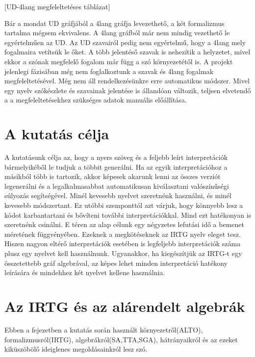 [UD-4lang megfeleltetéses táblázat]

Bár a mondat UD gráfjából a 4lang gráfja levezethető, a két formalizmus tartalma mégsem ekvivalens. A 4lang gráfból már nem mindig vezethető le egyértelműen az UD. Az UD szavairól pedig nem egyértelmű, hogy a 4lang mely fogalmaira vetítsük le őket. A több jelentéső szavak is nehezítik a helyzetet, mivel ekkor a szónak megfelelő fogalom már függ a szó környezetétől is. A projekt jelenlegi fázisában még nem foglalkoztunk a szavak és 4lang fogalmak megfeleltetésével. Még nem áll rendelkezésünkre erre automatikus módszer. Mivel egy nyelv szókészlete és szavainak jelentése is állandóan változik, teljsen elvetendő a a megfeleltetésekhez szükséges adatok manuális előállítása.



\section{A kutatás célja}


A kutatásunk célja az, hogy a nyers szöveg és a feljebb leírt interpretációk bármelyikéből le tudjuk a többit generálni. Ha az egyik interpretációhoz a másikból több is tartozik, akkor képesek akarunk lenni az összes verziót legenerálni és a legalkalmasabbat automatikusan kiválasztani valószínűségi súlyozás segítségével. Minél kevesebb nyelvet szeretnénk használni, és minél kevesebb módszertant. Ez utóbbi szemponttól azt várjuk, hogy könnyebb lesz a kódot karbantartani és bővíteni további interpretációkkal. Mind ezt hatékonyan is szeretnénk csinálni. E téren az alap célunk egy négyzetes lefutási idő a bemenet méretének függvényében. Ezeknek a megkötéseknek az IRTG nyelv eleget tesz. Hiszen nagyon eltérő interpretációk esetében is legfeljebb interpretációk száma plusz egy nyelvet kell használnunk. Ugyanakkor, ha kiegészítjük az IRTG-t egy összetettebb gráf algebrával, az képes lehet minden interpretáció hatékony leírására és mindehhez két nyelvet kellene használnia.

\section{Az IRTG és az alárendelt algebrák}
Ebben a fejezetben a kutatás során használt környezetről(ALTO), formalizmusról(IRTG), algebrákról(SA,TTA,SGA), hátrányaikról és az ezeket kiküszöbölő ideiglenes megoldásainkról lesz szó.


